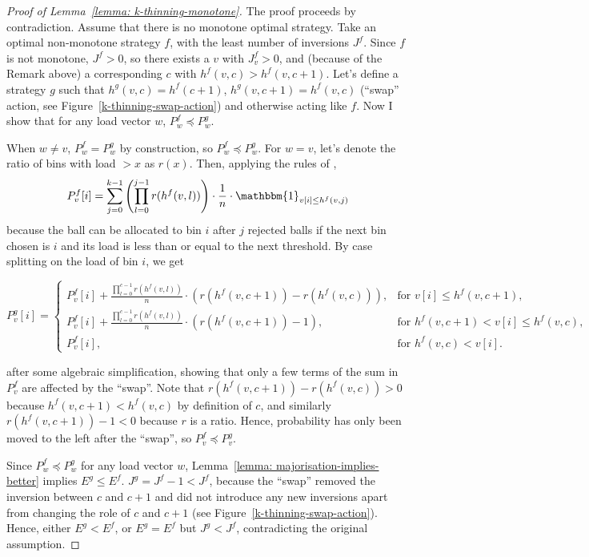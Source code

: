 \begin{proof}[Proof of Lemma~\ref{lemma: k-thinning-monotone}]
    The proof proceeds by contradiction. Assume that there is no monotone optimal strategy. Take an optimal non-monotone strategy $f$, with the least number of inversions $J^f$. Since $f$ is not monotone, $J^f>0$, so there exists a $v$ with $J^f_v>0$, and (because of the Remark above) a corresponding $c$ with $h^f(v,c)>h^f(v,c+1)$. Let's define a strategy $g$ such that $h^g(v,c)=h^f(c+1)$, $h^g(v,c+1)=h^f(v,c)$ (``swap'' action, see Figure~\ref{k-thinning-swap-action}) and otherwise acting like $f$. Now I show that for any load vector $w$, $P^f_w \preccurlyeq P^g_w$.
    
    When $w\neq v$, $P^f_w=P^g_w$ by construction, so $P^f_w \preccurlyeq P^g_w$. For $w=v$, let's denote the ratio of bins with load $>x$ as $r(x)$. Then, applying the rules of \KThinning, $$P^f_v[i]=\sum_{j=0}^{k-1} \left(\prod_{l=0}^{j-1} r(h^f(v,l))\right)\cdot\frac{1}{n}\cdot\mathbbm{1}_{v[i]\leq h^f(v,j)}$$ because the ball can be allocated to bin $i$ after $j$ rejected balls if the next bin chosen is $i$ and its load is less than or equal to the next threshold. By case splitting on the load of bin $i$, we get
    
    $$P^g_v[i]= \begin{cases}
        P^f_v[i]+\frac{\prod_{l=0}^{c-1} r(h^f(v,l))}{n}\cdot(r(h^f(v,c+1))-r(h^f(v,c))), & \text{for } v[i]\leq h^f(v,c+1),\\
        P^f_v[i]+\frac{\prod_{l=0}^{c-1} r(h^f(v,l))}{n}\cdot(r(h^f(v,c+1))-1), & \text{for } h^f(v,c+1)<v[i]\leq h^f(v,c),\\
        P^f_v[i], & \text{for } h^f(v,c)<v[i].
    \end{cases}$$
    
    after some algebraic simplification, showing that only a few terms of the sum in $P_v^f$ are affected by the ``swap''. Note that $r(h^f(v,c+1))-r(h^f(v,c))>0$ because $h^f(v,c+1)<h^f(v,c)$ by definition of $c$, and similarly $r(h^f(v,c+1))-1<0$ because $r$ is a ratio. Hence, probability has only been moved to the left after the ``swap'', so $P^f_v \preccurlyeq P^g_v$.
    
    Since $P^f_w\preccurlyeq P^g_w$ for any load vector $w$, Lemma~\ref{lemma: majorisation-implies-better} implies $E^g\leq E^f$. $J^g=J^f-1<J^f$, because the ``swap'' removed the inversion between $c$ and $c+1$ and did not introduce any new inversions apart from changing the role of $c$ and $c+1$ (see Figure~\ref{k-thinning-swap-action}). Hence, either $E^g<E^f$, or $E^g=E^f$ but $J^g<J^f$, contradicting the original assumption.
\end{proof}

